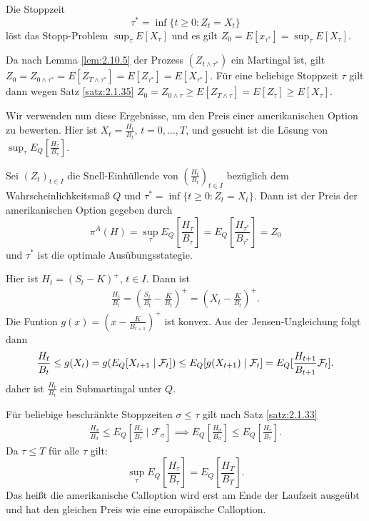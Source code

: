 \documentclass[a4paper,twoside,DIV15,BCOR12mm]{scrbook}
\newcommand{\cF}{\mathcal F}
\begin{document}
\begin{satz} Die Stoppzeit
\[
\tau^* = \inf\{t \ge 0: Z_t = X_t\}
\]
löst das Stopp-Problem $\sup_{\tau}E[X_\tau]$ und es gilt $Z_0 = E[x_{\tau^*}] = \sup_\tau E[X_\tau]$.
\end{satz}

\begin{beweis}
Da nach Lemma \ref{lem:2.10.5} der Prozess $(Z_{t\wedge \tau^*})$ ein Martingal ist, gilt $Z_0 = Z_{0\wedge \tau^*} = E[Z_{T\wedge \tau^*}] = E[Z_{\tau^*}]=E[X_{\tau^*}]$. Für eine beliebige Stoppzeit $\tau$ gilt dann wegen Satz \ref{satz:2.1.35}
$Z_0 = Z_{0\wedge \tau} \ge E[Z_{T \wedge\tau}] = E[Z_\tau] \ge E[X_\tau]$.
\end{beweis}

Wir verwenden nun diese Ergebnisse, um den Preis einer amerikanischen Option zu bewerten. Hier ist $X_t = \frac{H_t}{B_t}$, $t=0,\ldots,T$, und gesucht ist die Lösung von $\sup_\tau E_Q[\frac{H_\tau}{B_\tau}]$.

\begin{korollar}
Sei $(Z_t)_{t\in I}$ die Snell-Einhüllende von $(\frac{H_t}{B_t})_{t\in I}$ bezüglich dem Wahrscheinlichkeitsmaß $Q$ und $\tau^* = \inf\{t\ge 0: Z_t= X_t\}$. Dann ist der Preis der amerikanischen Option gegeben durch
\[
\pi^A(H) = \sup_{\tau}E_Q\left[\frac{H_\tau}{B_\tau}\right] = E_Q\left[\frac{H_{\tau^*}}{B_{\tau^*}}\right] = Z_0
\]
und $\tau^*$ ist die optimale Ausübungsstategie.
\end{korollar}

\begin{beispiel}
Hier ist $H_t = (S_t - K)^+$, $t\in I$. Dann ist 
\begin{align*}
\frac{H_t}{B_t} = \left(\frac{S_t}{B_t} - \frac{K}{B_t}\right)^+ = \left( X_t - \frac{K}{B_t}\right)^+.
\end{align*}
Die Funtion $g(x) = \left(x - \frac{K}{B_{t+1}}\right)^+$ ist konvex. Aus der Jensen-Ungleichung folgt dann
\begin{align*}
\frac{H_t}{B_t} \le g(X_t) = g(E_Q[X_{t+1}\mid \cF_t]) \le E_Q[g(X_{t+1}) \mid \cF_t] = E_Q[\frac{H_{t+1}}{B_{t+1}}\mit \cF_t].
\end{align*}
daher ist $\frac{H_t}{B_t}$ ein Submartingal unter $Q$.

Für beliebige beschränkte Stoppzeiten $\sigma\le\tau$ gilt nach Satz \ref{satz:2.1.33}
\begin{align*}
\frac{H_\sigma}{B_\sigma} \le E_Q\left[\frac{H_\tau}{B_\tau}\mid \cF_\sigma\right] 
\implies E_Q\left[\frac{H_\sigma}{B_\sigma}\right] \le E_Q\left[\frac{H_\tau}{B_{\tau}}\right].
\end{align*}
Da $\tau\le T$ für alle $\tau$ gilt:
\[
\sup_{\tau} E_Q\left[\frac{H_\tau}{B_\tau}\right] = E_Q\left[\frac{H_T}{B_T}\right].
\]
Das heißt die amerikanische Calloption wird erst am Ende der Laufzeit ausgeübt und hat den gleichen Preis wie eine europäische Calloption.
\end{beispiel}
\end{document}
